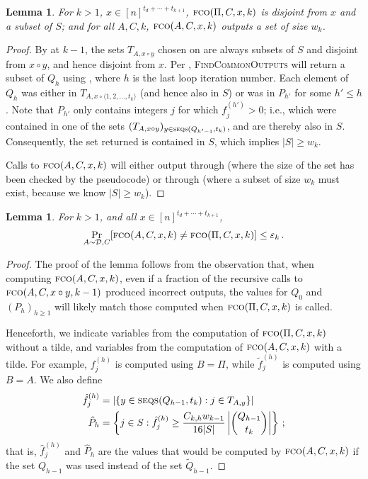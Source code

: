\documentclass[10pt,a4paper]{article}
\newtheorem{lemma}[theorem]{Lemma}
\theoremstyle{definition}
\theoremstyle{remark}
\newcommand{\cD}{\mathcal{D}}
\newcommand{\tQ}{\widetilde{Q}}
\newcommand{\hP}{\hat{P}}
\newcommand{\hf}{\hat{f}}
\let\epsilon\varepsilon
\newcommand{\fco}{\textsc{fco}\xspace}
\newcommand{\concat}{\mathbin{\circ}}       %
\newcommand{\SSD}[2]{\textsc{seqs}(#1,#2)}  %
\begin{document}
\begin{itemize}
\begin{itemize}
\begin{lemma}\label{lem:pd-step-case-aux}
  For $k > 1$, $x \in [n]^{t_d+\cdots+t_{k+1}}$, $\fco(\Pi, C, x, k)$ is
  disjoint from $x$ and a subset of $S$; and for all $A, C, k$,
  $\fco(A,C,x,k)$ outputs a set of size $w_k$.
\end{lemma}
%
\begin{proof}%
  By  at $k - 1$, the sets $T_{A,x \concat y}$
  chosen on  are always subsets of $S$ and
  disjoint from $x \concat y$, and hence disjoint from $x$. Per
  , \textsc{FindCommonOutputs} will return a subset of
  $Q_h$ using , where $h$ is the last loop
  iteration number. Each element of $Q_h$ was either in $T_{A,x \circ \langle
  1,2,\ldots,t_k\rangle}$ (and hence also in $S$) or was in $P_{h'}$ for some
  $h' \le h$. Note that $P_{h'}$ only contains integers $j$ for which
  $f_j^{(h')} > 0$; i.e., which were contained in one of the sets $(T_{A,x
  \concat y})_{y \in \SSD{Q_{h'-1}}{t_k}}$, and are thereby also in $S$.
  Consequently, the set returned is contained in $S$, which implies $|S| \ge
  w_k$.

  Calls to $\fco(A,C,x,k)$ will either output through
   (where the size of the set has been checked by
  the pseudocode) or through  (where a subset of
  size $w_k$ must exist, because we know $|S| \ge w_k$).
\end{proof}

\begin{lemma}\label{lem:pd-stability}
  For $k > 1$, and all $x \in [n]^{t_d + \cdots + t_{k+1}}$, 
  \begin{align*}
    \Pr_{A \sim \cD, C}[\fco(A, C, x, k) \ne \fco(\Pi, C, x, k)] \le \epsilon_k \,.
  \end{align*}
\end{lemma}
%
\begin{proof}%
  The proof of the lemma follows from the observation that, when computing
  $\fco(A,C,x,k)$, even if a fraction of the recursive calls to $\fco(A,C,x
  \concat y,k-1)$ produced incorrect outputs, the values for $Q_0$ and $(P_h)_{h \ge 1}$ will likely match those computed when $\fco(\Pi,C,x,k)$ is called.
  
  Henceforth, we indicate variables from the computation of $\fco(\Pi,C,x,k)$ without a tilde,
  and variables from the computation of $\fco(A,C,x,k)$ with a tilde. For example, $f_j^{(h)}$
  is computed using $B = \Pi$, while $\tilde{f}_j^{(h)}$ is computed using $B = A$. We also define
  \begin{align*}
    \hf_j^{(h)} &= \left|\left\{ y \in \SSD{Q_{h-1}}{t_k} : j \in T_{A,y} \right\}\right| \\
    \hP_h &= \left\{j \in S : \hf_j^{(h)} \ge \frac{C_{k,h} w_{k-1}}{16 |S|} \left|\binom{Q_{h-1}}{t_k}\right| \right\} \,;
  \end{align*}
  that is, $\hf_j^{(h)}$ and $\hP_h$ are the values that would be computed by $\fco(A,C,x,k)$ if the set $Q_{h-1}$ was used instead of the set $\tQ_{h-1}$.
  

\end{proof}
\end{itemize}
\end{itemize}
\end{document}
